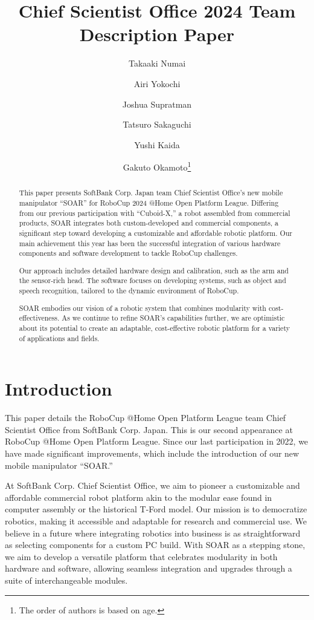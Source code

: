 \documentclass[runningheads,a4paper]{llncs}
\title{Chief Scientist Office 2024 Team Description Paper}
\author{Takaaki Numai \and Airi Yokochi \and Joshua Supratman \and Tatsuro Sakaguchi \and Yushi Kaida \and Gakuto Okamoto\thanks{The order of authors is based on age.}}
\institute{SoftBank Corp. Chief Scientist Office \\
	\texttt{https://www.robocup.ros-sier.com/, https://github.com/sbgisen}}
\begin{document}
\maketitle
%
%

\begin{abstract}
	This paper presents SoftBank Corp. Japan team Chief Scientist Office’s new mobile manipulator “SOAR” for RoboCup 2024 @Home Open Platform League.
	Differing from our previous participation with “Cuboid-X,” a robot assembled from commercial products, SOAR integrates both custom-developed and commercial components, a significant step toward developing a customizable and affordable robotic platform.
	Our main achievement this year has been the successful integration of various hardware components and software development to tackle RoboCup challenges.

	Our approach includes detailed hardware design and calibration, such as the arm and the sensor-rich head.
	The software focuses on developing systems, such as object and speech recognition, tailored to the dynamic environment of RoboCup.

	SOAR embodies our vision of a robotic system that combines modularity with cost-effectiveness.
	As we continue to refine SOAR’s capabilities further, we are optimistic about its potential to create an adaptable, cost-effective robotic platform for a variety of applications and fields.

\end{abstract}



\section{Introduction}
This paper details the RoboCup @Home Open Platform League team Chief Scientist Office from SoftBank Corp. Japan.
This is our second appearance at RoboCup @Home Open Platform League.
Since our last participation in 2022, we have made significant improvements, which include the introduction of our new mobile manipulator “SOAR.”

At SoftBank Corp. Chief Scientist Office, we aim to pioneer a customizable and affordable commercial robot platform akin to the modular ease found in computer assembly or the historical T-Ford model.
Our mission is to democratize robotics, making it accessible and adaptable for research and commercial use.
We believe in a future where integrating robotics into business is as straightforward as selecting components for a custom PC build.
With SOAR as a stepping stone, we aim to develop a versatile platform that celebrates modularity in both hardware and software, allowing seamless integration and upgrades through a suite of interchangeable modules.
\end{document}
